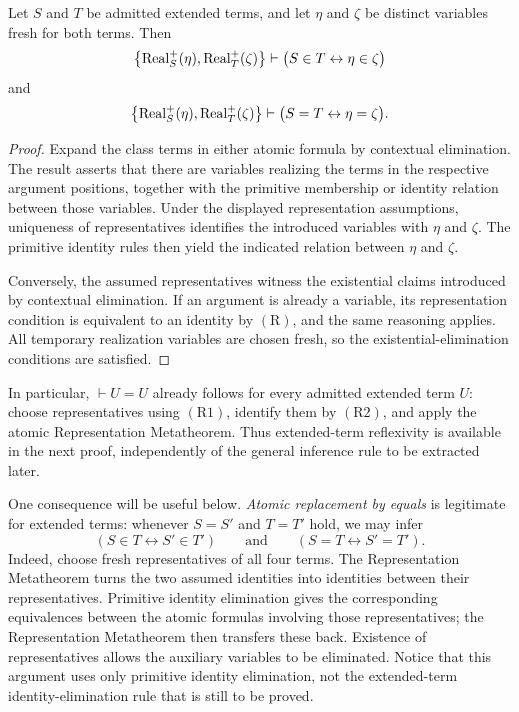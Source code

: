 \begin{metatheorem}
\label{meta:representation-of-atomic-formulas}
Let \(S\) and \(T\) be admitted extended terms, and let \(\eta\)
and \(\zeta\) be distinct variables fresh for both terms. Then
\[
\left\{
\operatorname{Real}^+_S(\eta),
\operatorname{Real}^+_T(\zeta)
\right\}
\vdash
\bigl(S\in T\leftrightarrow\eta\in\zeta\bigr)
\]
and
\[
\left\{
\operatorname{Real}^+_S(\eta),
\operatorname{Real}^+_T(\zeta)
\right\}
\vdash
\bigl(S=T\leftrightarrow\eta=\zeta\bigr).
\]
\end{metatheorem}

\begin{proof}
Expand the class terms in either atomic formula by contextual
elimination. The result asserts that there are variables realizing
the terms in the respective argument positions, together with the
primitive membership or identity relation between those variables.
Under the displayed representation assumptions, uniqueness of
representatives identifies the introduced variables with \(\eta\)
and \(\zeta\). The primitive identity rules then yield the indicated
relation between \(\eta\) and \(\zeta\).

Conversely, the assumed representatives witness the existential
claims introduced by contextual elimination. If an argument is
already a variable, its representation condition is equivalent to
an identity by \((\mathrm{R})\), and the same reasoning applies.
All temporary realization variables are chosen fresh, so the
existential-elimination conditions are satisfied.
\end{proof}

In particular, \(\vdash U=U\) already follows for every admitted
extended term \(U\): choose representatives using \((\mathrm{R1})\),
identify them by \((\mathrm{R2})\), and apply the atomic
Representation Metatheorem. Thus extended-term reflexivity is
available in the next proof, independently of the general inference
rule to be extracted later.

One consequence will be useful below. \emph{Atomic replacement by
equals} is legitimate for extended terms: whenever \(S=S'\) and
\(T=T'\) hold, we may infer
\[
(S\in T\leftrightarrow S'\in T')
\qquad\text{and}\qquad
(S=T\leftrightarrow S'=T').
\tag{A}
\]
Indeed, choose fresh representatives of all four terms. The
Representation Metatheorem turns the two assumed identities into
identities between their representatives. Primitive identity
elimination gives the corresponding equivalences between the atomic
formulas involving those representatives; the Representation
Metatheorem then transfers these back. Existence of representatives
allows the auxiliary variables to be eliminated. Notice that this
argument uses only primitive identity elimination, not the
extended-term identity-elimination rule that is still to be proved.

